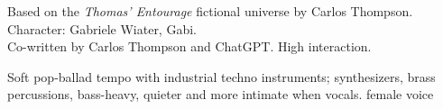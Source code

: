 

\begin{notes}
Based on the \emph{Thomas’ Entourage} fictional universe by Carlos Thompson.\\
Character: Gabriele Wiater, Gabi.\\
Co-written by Carlos Thompson and ChatGPT. %
High interaction.
\end{notes}

\begin{style}
Soft pop-ballad tempo with industrial techno instruments; synthesizers, brass percussions, bass-heavy, quieter and more intimate when vocals. %
female voice
\end{style}

